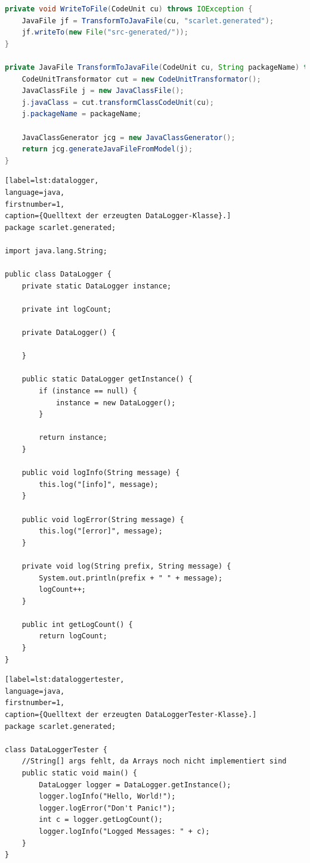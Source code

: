 \documentclass[12pt,oneside,a4paper,parskip]{scrbook}
\begin{document}
\begin{lstlisting}[label=lst:dataloggergen,
				   language=java,
				   firstnumber=1,
				   caption=Quelltext zur Erzeugung des DataLoggers und des zugehörigen Testers.]
private void WriteToFile(CodeUnit cu) throws IOException {
	JavaFile jf = TransformToJavaFile(cu, "scarlet.generated");
	jf.writeTo(new File("src-generated/"));
}

private JavaFile TransformToJavaFile(CodeUnit cu, String packageName) throws IOException {
	CodeUnitTransformator cut = new CodeUnitTransformator();
	JavaClassFile j = new JavaClassFile();
	j.javaClass = cut.transformClassCodeUnit(cu);
	j.packageName = packageName;
	
	JavaClassGenerator jcg = new JavaClassGenerator();
	return jcg.generateJavaFileFromModel(j);
}
\end{lstlisting}

\begin{lstlisting}[label=lst:datalogger,
language=java,
firstnumber=1,
caption={Quelltext der erzeugten DataLogger-Klasse}.]
package scarlet.generated;

import java.lang.String;

public class DataLogger {
	private static DataLogger instance;
	
	private int logCount;
	
	private DataLogger() {
	
	}
	
	public static DataLogger getInstance() {
		if (instance == null) {
			instance = new DataLogger();
		}
		
		return instance;
	}
	
	public void logInfo(String message) {
		this.log("[info]", message);
	}
	
	public void logError(String message) {
		this.log("[error]", message);
	}
	
	private void log(String prefix, String message) {
		System.out.println(prefix + " " + message);
		logCount++;
	}
	
	public int getLogCount() {
		return logCount;
	}
}
\end{lstlisting}

\begin{lstlisting}[label=lst:dataloggertester,
language=java,
firstnumber=1,
caption={Quelltext der erzeugten DataLoggerTester-Klasse}.]
package scarlet.generated;

class DataLoggerTester {	
	//String[] args fehlt, da Arrays noch nicht implementiert sind
	public static void main() {
		DataLogger logger = DataLogger.getInstance();
		logger.logInfo("Hello, World!");
		logger.logError("Don't Panic!");
		int c = logger.getLogCount();
		logger.logInfo("Logged Messages: " + c);
	}
}
\end{lstlisting}
\end{document}

